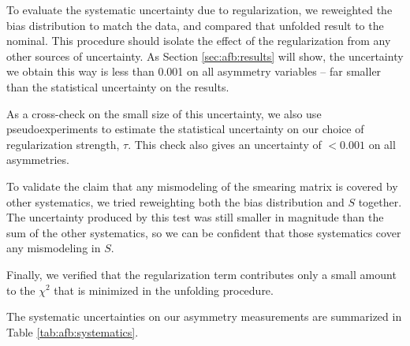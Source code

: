 To evaluate the systematic uncertainty due to regularization, we
reweighted the bias distribution to match the data, and compared that
unfolded result to the nominal. This procedure should isolate the
effect of the regularization from any other sources of
uncertainty. As Section \ref{sec:afb:results} will show, the
uncertainty we obtain this way is less than 0.001 on
all asymmetry variables -- far smaller than the statistical
uncertainty on the results.

As a cross-check on the small size of this uncertainty, we also
use pseudoexperiments to estimate the statistical uncertainty on our
choice of regularization strength, $\tau$. This check also gives an
uncertainty of $<0.001$ on all asymmetries.

To validate the claim that any mismodeling of the smearing matrix is
covered by other systematics, we tried reweighting both the bias
distribution and $S$ together. The uncertainty produced by this test
was still smaller in magnitude than the sum of the other systematics,
so we can be confident that those systematics cover any mismodeling in
$S$.

Finally, we verified that the regularization term contributes only a
small amount to the $\chi^2$ that is minimized in the unfolding
procedure.

The systematic uncertainties on our asymmetry measurements are
summarized in Table \ref{tab:afb:systematics}.


